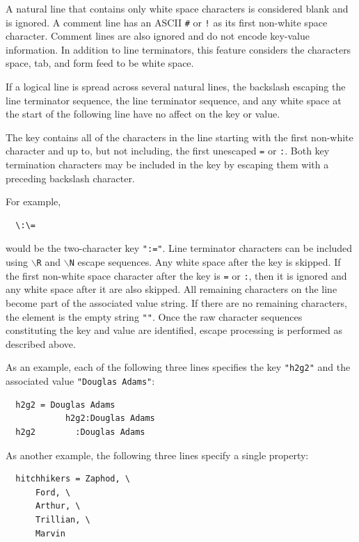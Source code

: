 \documentclass[a4paper,fleqn]{report}
\begin{document}
A natural line that contains only white space characters is considered
blank and is ignored. A comment line has an ASCII \texttt{\#} or
\texttt{!} as its first non-white space character. Comment lines are
also ignored and do not encode key-value information. In addition to
line terminators, this feature considers the characters space, tab,
and form feed to be white space.

If a logical line is spread across several natural lines, the
backslash escaping the line terminator sequence, the line terminator
sequence, and any white space at the start of the following line have
no affect on the key or value.

The key contains all of the characters in the line starting with the
first non-white character and up to, but not including, the first
unescaped \texttt{=} or \texttt{:}. Both key termination characters
may be included in the key by escaping them with a preceding backslash
character.

For example,

\begin{lstlisting}
  \:\=
\end{lstlisting}

would be the two-character key \texttt{":="}. Line terminator
characters can be included using \texttt{$\backslash$R} and
\texttt{$\backslash$N} escape sequences. Any white space after the key
is skipped. If the first non-white space character after the key is
\texttt{=} or \texttt{:}, then it is ignored and any white space after
it are also skipped. All remaining characters on the line become part
of the associated value string. If there are no remaining characters,
the element is the empty string \texttt{""}. Once the raw character
sequences constituting the key and value are identified, escape
processing is performed as described above.

As an example, each of the following three lines specifies the key
\texttt{"h2g2"} and the associated value \texttt{"Douglas Adams"}:

\begin{lstlisting}
  h2g2 = Douglas Adams
            h2g2:Douglas Adams
  h2g2        :Douglas Adams  
\end{lstlisting}

As another example, the following three lines specify a single
property:

\begin{lstlisting}
  hitchhikers = Zaphod, \
      Ford, \
      Arthur, \
      Trillian, \
      Marvin  
\end{lstlisting}
\end{document}
